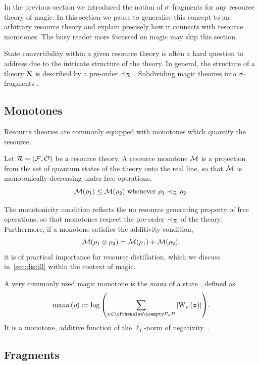 \documentclass[pra,
aps,
twocolumn,
superscriptaddress,
groupedaddress,
nofootinbib,
reprint
]{revtex4-1}
\begin{document}
In the previous section we introduced the notion of $\sigma$--fragments for any resource theory of magic. In this section we pause to generalise this concept to an arbitrary resource theory and explain precisely how it connects with resource monotones. The busy reader more focussed on magic may skip this section.

State convertibility within a given resource theory is often a hard question to address due to the intricate structure of the theory.
In general, the structure of a theory $\mathcal{R}$ is described by a pre-order $\prec_{\mathcal{R}}$ .
Subdividing magic theories into $\sigma$--fragments .
\subsection{Monotones}\label{sec:mono}

Resource theories are commonly equipped with monotones which quantify the resource. 
\begin{definition}\label{def:mono}
    Let $\mathcal{R} = (\mathcal{F}, \mathcal{O})$ be a resource theory.
    A resource monotone $\mathcal{M}$ is a projection from the set of quantum states of the theory onto the real line, so that $\mathcal{M}$ is monotonically decreasing under free operations,
    \begin{equation}
        \mathcal{M}(\rho_1) \leq \mathcal{M}(\rho_2)\ \text{whenever}\ \rho_1 \prec_{\mathcal{R}} \rho_2.
    \end{equation}
\end{definition}
The monotonicity condition reflects the no resource generating property of free operations, so that monotones respect the pre-order $\prec_{\mathcal{R}}$ of the theory.
Furthermore, if a monotone satisfies the additivity condition,
\begin{equation}
    \mathcal{M}(\rho_1 \otimes \rho_2) = \mathcal{M}(\rho_1) + \mathcal{M}(\rho_2),
\end{equation}
it is of practical importance for resource distillation, which we discuss in~\cref{sec:distill} within the context of magic.

A very commonly used magic monotone is the \emph{mana} of a state , defined as
\begin{equation}
    \mana{\rho} \coloneqq \log{\left(\sum\limits_{\bmz \in \pd} \abs{\W[\bmz]{\rho}}\right)}.
\end{equation}
It is a monotone, additive function of the $\ell_1$-norm of negativity~.

\subsection{Fragments}
\end{document}
